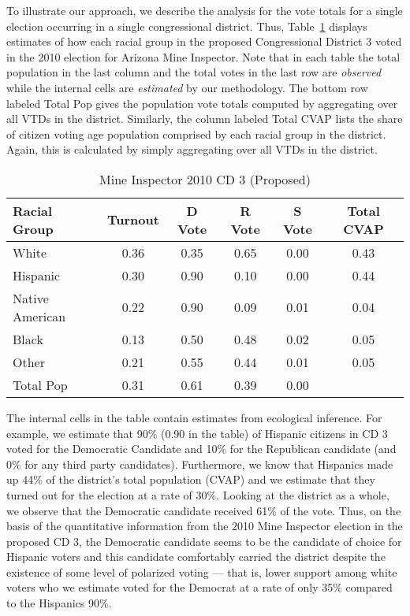 \documentclass[12pt]{scrartcl}
\begin{document}
To illustrate our approach, we describe the analysis for the vote
totals for a single election occurring in a single congressional
district.  Thus, Table~\ref{smine_cvap_cd_3_ex} displays estimates of
how each racial group in the proposed Congressional District 3 voted
in the 2010 election for Arizona Mine Inspector. Note that in each
table the total population in the last column and the total votes in
the last row are {\it observed} while the internal cells are {\it
  estimated} by our methodology. The bottom row labeled Total Pop
gives the population vote totals computed by aggregating over all VTDs
in the district.  Similarly, the column labeled Total CVAP lists the
share of citizen voting age population comprised by each racial group
in the district.  Again, this is calculated by simply aggregating over
all VTDs in the district.

\begin{table}[ht]
\begin{center}
\caption{Mine Inspector 2010 CD 3 (Proposed)}
\label{smine_cvap_cd_3_ex}
\begin{tabular}{lccccc}
  \hline
Racial Group & Turnout & D Vote & R Vote & S Vote & Total CVAP\\ 
  \hline
White & 0.36 & 0.35 & 0.65 & 0.00 & 0.43 \\ 
  Hispanic & 0.30 & 0.90 & 0.10 & 0.00 & 0.44 \\ 
  Native American & 0.22 & 0.90 & 0.09 & 0.01 & 0.04 \\ 
  Black & 0.13 & 0.50 & 0.48 & 0.02 & 0.05 \\ 
  Other & 0.21 & 0.55 & 0.44 & 0.01 & 0.05 \\ 
  Total Pop & 0.31 & 0.61 & 0.39 & 0.00 &  \\ 
   \hline
\end{tabular}
\end{center}
\end{table}

The internal cells in the table contain estimates from ecological
inference. For example, we estimate that 90\% (0.90 in the table) of
Hispanic citizens in CD 3 voted for the Democratic Candidate and 10\%
for the Republican candidate (and 0\% for any third party candidates).
Furthermore, we know that Hispanics made up 44\% of the district's
total population (CVAP) and we estimate that they turned out for the
election at a rate of 30\%.  Looking at the district as a whole, we
observe that the Democratic candidate received 61\% of the vote. Thus,
on the basis of the quantitative information from the 2010 Mine
Inspector election in the proposed CD 3, the Democratic candidate
seems to be the candidate of choice for Hispanic voters and this
candidate comfortably carried the district despite the existence of
some level of polarized voting --- that is, lower support among white
voters who we estimate voted for the Democrat at a rate of only 35\%
compared to the Hispanics 90\%.
\end{document}
